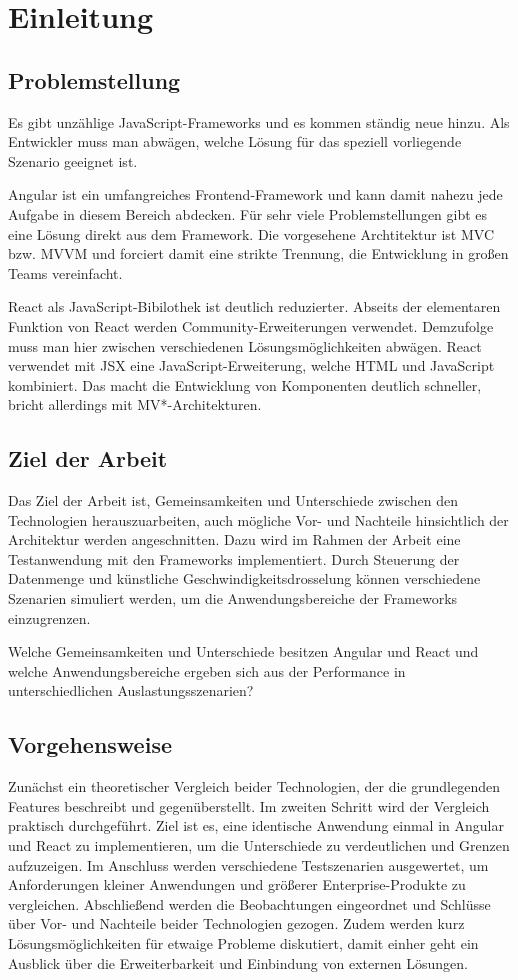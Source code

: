 \chapter{Einleitung}

\section{Problemstellung}
Es gibt unzählige JavaScript-Frameworks und es kommen ständig neue hinzu. Als Entwickler muss man abwägen,
welche Lösung für das speziell vorliegende Szenario geeignet ist.

Angular ist ein umfangreiches Frontend-Framework und kann damit nahezu
jede Aufgabe in diesem Bereich abdecken. Für sehr viele Problemstellungen
gibt es eine Lösung direkt aus dem Framework. Die vorgesehene Archtitektur ist
MVC bzw. MVVM und forciert damit eine strikte Trennung, die Entwicklung in großen Teams vereinfacht.

React als JavaScript-Bibilothek ist deutlich reduzierter. Abseits der elementaren Funktion von React
werden Community-Erweiterungen verwendet. Demzufolge muss man hier zwischen verschiedenen
Lösungsmöglichkeiten abwägen. React verwendet mit JSX eine JavaScript-Erweiterung,
welche HTML und JavaScript kombiniert. Das macht die Entwicklung von Komponenten deutlich schneller,
bricht allerdings mit MV*-Architekturen.

\section{Ziel der Arbeit}
Das Ziel der Arbeit ist, Gemeinsamkeiten und Unterschiede zwischen den Technologien herauszuarbeiten,
auch mögliche Vor- und Nachteile hinsichtlich der Architektur werden angeschnitten.
Dazu wird im Rahmen der Arbeit eine Testanwendung mit den Frameworks implementiert.
Durch Steuerung der Datenmenge und künstliche Geschwindigkeitsdrosselung können verschiedene
Szenarien simuliert werden, um die Anwendungsbereiche der Frameworks einzugrenzen.

Welche Gemeinsamkeiten und Unterschiede besitzen Angular und React und welche Anwendungsbereiche
ergeben sich aus der Performance in unterschiedlichen Auslastungsszenarien?

\section{Vorgehensweise}

Zunächst ein theoretischer Vergleich beider Technologien, der die grundlegenden Features beschreibt und gegenüberstellt.
Im zweiten Schritt wird der Vergleich praktisch durchgeführt. Ziel ist es, eine identische Anwendung einmal in Angular
und React zu implementieren, um die Unterschiede zu verdeutlichen und Grenzen aufzuzeigen. Im Anschluss werden verschiedene
Testszenarien ausgewertet, um Anforderungen kleiner Anwendungen und größerer Enterprise-Produkte zu vergleichen.
Abschließend werden die Beobachtungen eingeordnet und Schlüsse über Vor- und Nachteile beider Technologien gezogen.
Zudem werden kurz Lösungsmöglichkeiten für etwaige Probleme diskutiert, damit einher geht ein Ausblick über
die Erweiterbarkeit und Einbindung von externen Lösungen.

